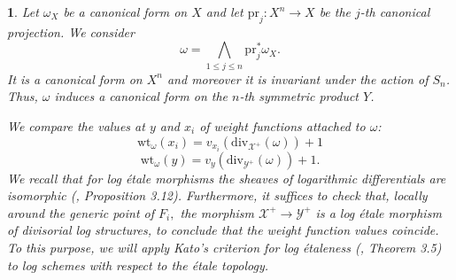 \documentclass{amsart}%
\numberwithin{equation}{subsection}
\theoremstyle{plain2}
\theoremstyle{definition2}
\theoremstyle{stepstyle}
\theoremstyle{point}
\theoremstyle{subpoint}
\newtheorem{subpoint}[equation]{}%
\newcommand{\spa}[1]{\begin{subpoint}#1\end{subpoint}}           %
\newcommand{\cX}{\ensuremath{\mathscr{X}}}
\newcommand{\cY}{\ensuremath{\mathscr{Y}}}
\renewcommand{\cY}{\ensuremath{\mathscr{Y}}}
\newcommand{\pr}{\mathrm{pr}}
\newcommand{\divisor}{\mathrm{div}}
\newcommand{\weight}{\mathrm{wt}}
\begin{document}
\spa{Let $\omega_X$ be a canonical form on $X$ and let $\pr_j:X^n \rightarrow X$ be the $j$-th canonical projection. We consider $$\omega= \bigwedge_{1\leqslant j \leqslant n} \pr_j^*\omega_X.$$ It is a canonical form on $X^n$ and moreover it is invariant under the action of $S_n$. Thus, $\omega$ induces a canonical form on the $n$-th symmetric product $Y$.


We compare the values at $y$ and $x_i$ of weight functions attached to $\omega$:
$$\weight_{\omega}(x_i)=v_{x_i}(\divisor_{\cX^+}(\omega)) +1 $$
$$\weight_{\omega}(y)=v_{y}(\divisor_{\cY^+}(\omega)) +1. $$ We recall that for log \'{e}tale morphisms the sheaves of logarithmic differentials are isomorphic (\cite{Kato1994a}, Proposition 3.12). Furthermore, it suffices to check that, locally around the generic point of $F_i,$ the morphism $\cX^+ \rightarrow \cY^+$ is a log \'{e}tale morphism of divisorial log structures, to conclude that the weight function values coincide. To this purpose, we will apply Kato's criterion for log \'{e}taleness (\cite{Kato1989}, Theorem 3.5) to log schemes with respect to the \'{e}tale topology.
}
\end{document}
